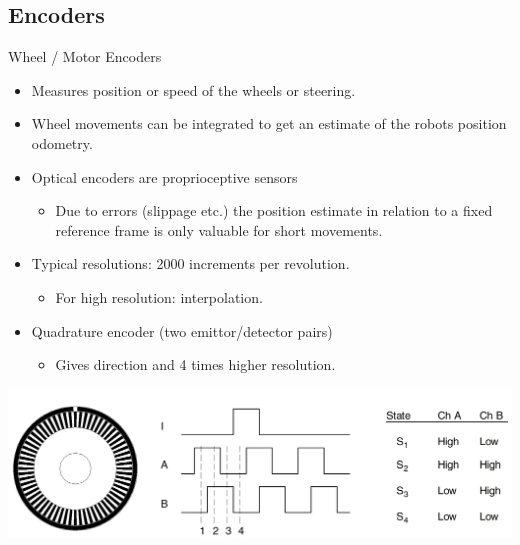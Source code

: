 \documentclass[compress]{beamer}
\begin{document}
\subsection{Encoders}
\begin{frame}{Wheel / Motor Encoders}

\begin{itemize}
    \item Measures position or speed of the wheels or steering.

\item Wheel movements can be integrated to get an estimate of the robots
position \rightarrow odometry.

\item Optical encoders are proprioceptive sensors

\begin{itemize}

\item
  Due to errors (slippage etc.) the position estimate in relation to a
  fixed reference frame is only valuable for short movements.
\end{itemize}

\item Typical resolutions: 2000 increments per revolution.

\begin{itemize}

\item
  For high resolution: interpolation.
\end{itemize}

\item Quadrature encoder (two emittor/detector pairs)

\begin{itemize}

\item
  Gives direction and 4 times higher resolution.
\end{itemize}

\end{itemize}

    \begin{center}
        \includegraphics[width=0.9\linewidth]{encoders1}
    \end{center}

\end{frame}
\end{document}

